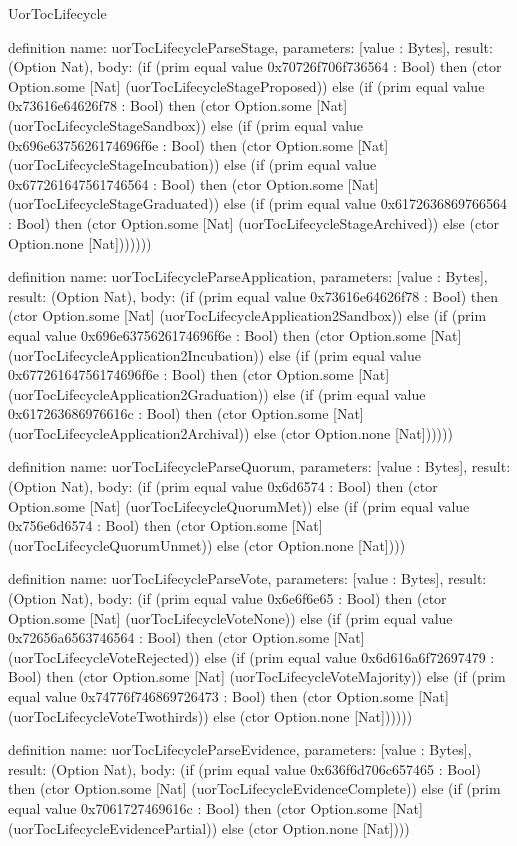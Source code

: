 \begin{lexlean}{UorTocLifecycle}
\begin{semanticmodule}
definition{
  name: uorTocLifecycleParseStage,
  parameters: [value : Bytes],
  result: (Option Nat),
  body: (if (prim equal value 0x70726f706f736564 : Bool) then (ctor Option.some [Nat] (uorTocLifecycleStageProposed)) else (if (prim equal value 0x73616e64626f78 : Bool) then (ctor Option.some [Nat] (uorTocLifecycleStageSandbox)) else (if (prim equal value 0x696e6375626174696f6e : Bool) then (ctor Option.some [Nat] (uorTocLifecycleStageIncubation)) else (if (prim equal value 0x677261647561746564 : Bool) then (ctor Option.some [Nat] (uorTocLifecycleStageGraduated)) else (if (prim equal value 0x6172636869766564 : Bool) then (ctor Option.some [Nat] (uorTocLifecycleStageArchived)) else (ctor Option.none [Nat]))))))
}

definition{
  name: uorTocLifecycleParseApplication,
  parameters: [value : Bytes],
  result: (Option Nat),
  body: (if (prim equal value 0x73616e64626f78 : Bool) then (ctor Option.some [Nat] (uorTocLifecycleApplication2Sandbox)) else (if (prim equal value 0x696e6375626174696f6e : Bool) then (ctor Option.some [Nat] (uorTocLifecycleApplication2Incubation)) else (if (prim equal value 0x67726164756174696f6e : Bool) then (ctor Option.some [Nat] (uorTocLifecycleApplication2Graduation)) else (if (prim equal value 0x617263686976616c : Bool) then (ctor Option.some [Nat] (uorTocLifecycleApplication2Archival)) else (ctor Option.none [Nat])))))
}

definition{
  name: uorTocLifecycleParseQuorum,
  parameters: [value : Bytes],
  result: (Option Nat),
  body: (if (prim equal value 0x6d6574 : Bool) then (ctor Option.some [Nat] (uorTocLifecycleQuorumMet)) else (if (prim equal value 0x756e6d6574 : Bool) then (ctor Option.some [Nat] (uorTocLifecycleQuorumUnmet)) else (ctor Option.none [Nat])))
}

definition{
  name: uorTocLifecycleParseVote,
  parameters: [value : Bytes],
  result: (Option Nat),
  body: (if (prim equal value 0x6e6f6e65 : Bool) then (ctor Option.some [Nat] (uorTocLifecycleVoteNone)) else (if (prim equal value 0x72656a6563746564 : Bool) then (ctor Option.some [Nat] (uorTocLifecycleVoteRejected)) else (if (prim equal value 0x6d616a6f72697479 : Bool) then (ctor Option.some [Nat] (uorTocLifecycleVoteMajority)) else (if (prim equal value 0x74776f746869726473 : Bool) then (ctor Option.some [Nat] (uorTocLifecycleVoteTwothirds)) else (ctor Option.none [Nat])))))
}

definition{
  name: uorTocLifecycleParseEvidence,
  parameters: [value : Bytes],
  result: (Option Nat),
  body: (if (prim equal value 0x636f6d706c657465 : Bool) then (ctor Option.some [Nat] (uorTocLifecycleEvidenceComplete)) else (if (prim equal value 0x7061727469616c : Bool) then (ctor Option.some [Nat] (uorTocLifecycleEvidencePartial)) else (ctor Option.none [Nat])))
}


\end{semanticmodule}
\end{lexlean}

